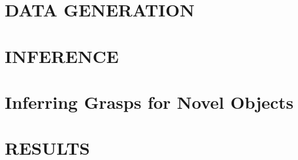 \documentclass[a4paper, 10pt, conference]{ieeeconf}
\begin{document}
\section{DATA GENERATION}


\section{INFERENCE}
\label{sec:infer}


\section{Inferring Grasps for Novel Objects}
\label{sec:infernovel}


\section{RESULTS}
\label{sec:results}


 




\addtolength{\textheight}{-12cm}

%
%
\end{document}
